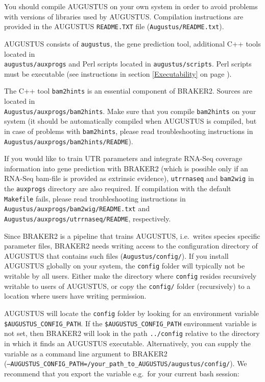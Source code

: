 \documentclass[a4paper,10pt]{report}
\begin{document}
You should compile AUGUSTUS on your own system in order to avoid problems with versions of libraries used by AUGUSTUS. Compilation instructions are provided in the AUGUSTUS \texttt{README.TXT} file
   (\texttt{Augustus/README.txt}).

AUGUSTUS consists of \texttt{augustus}, the gene prediction tool, additional C++ tools located in\\ \texttt{augustus/auxprogs} and Perl scripts located in \texttt{augustus/scripts}. Perl scripts must be executable (see instructions in section \ref{Executability} on page \pageref{Executability}). 
   
   The C++ tool \texttt{bam2hints} is an essential component of BRAKER2. Sources are located in \\\texttt{Augustus/auxprogs/bam2hints}. Make sure that you compile \texttt{bam2hints} on your system (it should be automatically compiled when AUGUSTUS is compiled, but in case of problems with \texttt{bam2hints}, please read troubleshooting instructions in 
   \texttt{Augustus/auxprogs/bam2hints/README}).
   
   If you would like to train UTR parameters and integrate RNA-Seq coverage information into gene prediction with BRAKER2 (which is possible only if an RNA-Seq bam-file is provided as extrinsic evidence), \texttt{utrrnaseq} and \texttt{bam2wig} in the \texttt{auxprogs} directory are also required. If compilation with the default \texttt{Makefile} fails, please read troubleshooting instructions in \texttt{Augustus/auxprogs/bam2wig/README.txt} and \texttt{Augustus/auxprogs/utrrnaseq/README}, respectively.
   
   Since BRAKER2 is a pipeline that trains AUGUSTUS, i.e.~writes species specific parameter files, BRAKER2 needs writing access to the configuration directory of AUGUSTUS that contains such files  (\texttt{Augustus/config/}). If you install AUGUSTUS
   globally on your system, the \texttt{config} folder will typically not be writable by all users. Either make the directory where \texttt{config} resides recursively writable to users of AUGUSTUS, or copy the \texttt{config/} folder (recursively) to a location where users have writing permission. 
   
   AUGUSTUS will locate the \texttt{config} folder by looking for an environment variable \texttt{\$AUGUSTUS\_CONFIG\_PATH}. If the \texttt{\$AUGUSTUS\_CONFIG\_PATH} environment variable is not set, then BRAKER2 will look in 
    the path \texttt{../config} relative to the directory in which it finds an AUGUSTUS executable. Alternatively, you can supply the variable as a command line argument to BRAKER2\\ (\texttt{--AUGUSTUS\_CONFIG\_PATH=/your\_path\_to\_AUGUSTUS/augustus/config/}). We recommend that you export the variable e.g.~for your current bash session:
\end{document}
